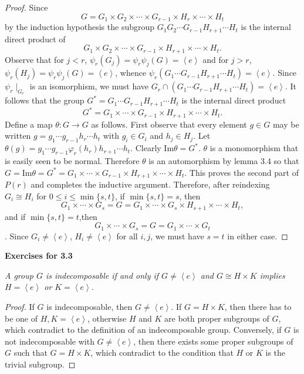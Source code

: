 \begin{proof}
Since 
$$G=G_1\times G_2\times\cdots\times G_{r-1}\times H_r\times\cdots\times H_t$$
by the induction hypothesis the subgroup $G_1G_2\cdots G_{r-1}H_{r+1}\cdots H_t$ is the internal direct product of 
$$G_1\times G_2\times\cdots\times G_{r-1}\times H_{r+1}\times\cdots\times H_t.$$
Observe that for $j<r$, $\psi_r(G_j)=\psi_r\psi_j(G)=\left<e\right>$ and for $j>r$, $\psi_r(H_j)=\psi_r\psi_j(G)=\left<e\right>$, whence $\psi_r(G_1\cdots G_{r-1}H_{r+1}\cdots H_t)=\left<e\right>$. Since $\psi_r\mid_{G_r}$ is an isomorphism, we must have $G_r\cap(G_1\cdots G_{r-1}H_{r+1}\cdots H_t)=\left<e\right>$. It follows that the group $G^*=G_1\cdots G_{r-1}H_{r+1}\cdots H_t$ is the internal direct product 
$$G^*=G_1\times\cdots\times G_{r-1}\times H_{r+1}\times\cdots\times H_t.$$
Define a map $\theta:G\to G$ as follows. First observe that every element $g\in G$ may be written $g=g_1\cdots g_{r-1}h_r\cdots h_t$ with $g_i\in G_i$ and $h_j\in H_j$. Let $\theta(g)=g_1\cdots g_{r-1}\varphi_r(h_r)h_{r+1}\cdots h_t$. Clearly $\mathrm{Im}\theta=G^*$. $\theta$ is a monomorphism that is easily seen to be normal. Therefore $\theta$ is an automorphism by lemma 3.4 so that $G=\mathrm{Im}\theta=G^*=G_1\times\cdots\times G_{r-1}\times H_{r+1}\times\cdots\times H_t$. This proves the second part of $P(r)$ and completes the inductive argument. Therefore, after reindexing $G_i\cong H_i$ for $0\le i\le\min\{s,t\}$, if $\min\{s,t\}=s$, then 
$$G_1\times\cdots\times G_s=G=G_1\times\cdots\times G_{s}\times H_{s+1}\times\cdots\times H_t,$$
and if $\min\{s,t\}=t$,then 
$$G_1\times\cdots\times G_s=G=G_1\times\cdots\times G_t$$. 
Since $G_i\ne\left<e\right>$, $H_i\ne\left<e\right>$ for all $i,j$, we must have $s=t$ in either case.
\end{proof}
\begin{center}
\begin{large}
    \textbf{Exercises for 3.3}
\end{large}
\end{center}
\begin{problem}\em
A group $G$ is indecomposable if and only if $G\ne\left<e\right>$ and $G\cong H\times K$ implies $H=\left<e\right>$ or $K=\left<e\right>$.
\end{problem}
\begin{proof}
If $G$ is indecomposable, then $G\ne\left<e\right>$. If $G=H\times K$, then there has to be one of $H,K=\left<e\right>$, otherwise $H$ and $K$ are both proper subgroups of $G$, which contradict to the definition of an indecomposable group. Conversely, if $G$ is not indecomposable with $G\ne\left<e\right>$, then there exists some proper subgroups of $G$ such that $G=H\times K$, which contradict to the condition that $H$ or $K$ is the trivial subgroup.
\end{proof}

